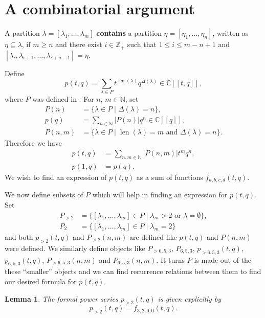 \documentclass[12pt, a4paper]{article}
\newtheorem{lemma}{Lemma}
\DeclareMathOperator{\len}{len}
\begin{document}
\section{A combinatorial argument}
\label{sec:comb-argum}

A partition $\lambda = [\lambda_1, \dots, \lambda_m]$ \textbf{contains} a partition $\eta = [\eta_1, \dots, \eta_n]$, written as $\eta \subseteq \lambda$, if $m \ge n$ and there exist $i \in \mathbb{Z}_+$ such that $1 \le i \le m - n + 1$ and $[\lambda_i, \lambda_{i + 1}, \dots, \lambda_{i + n - 1}] = \eta$.

Define
\begin{equation*}
  p(t, q) = \sum_{\lambda \in P}t^{\len(\lambda)}q^{\Delta(\lambda)} \in \mathbb{C}[[t, q]],
\end{equation*}
where $P$ was defined in .
For $n$, $m \in \mathbb{N}$, set
\begin{align*}
  P(n) &= \{\lambda \in P \mid \Delta(\lambda) = n\}, \\
  p(q) &= \sum_{n \in \mathbb{N}}|P(n)|q^n \in \mathbb{C}[[q]], \\
  P(n, m) &= \{\lambda \in P \mid \len(\lambda) = m\text{ and }\Delta(\lambda) = n\}.
\end{align*}
Therefore we have
\begin{align*}
  p(t, q) &= \sum_{n, m \in \mathbb{N}}|P(n, m)|t^mq^n, \\
  p(1, q) &= p(q).
\end{align*}
We wish to find an expression of $p(t, q)$ as a sum of functions $f_{a, b, c, d}(t, q)$.

We now define subsets of $P$ which will help in finding an expression for $p(t, q)$.
Set
\begin{align*}
  P_{>2} &= \{[\lambda_1, \dots, \lambda_m] \in P \mid \lambda_m > 2\text{ or }\lambda = \emptyset\}, \\
  P_2 &= \{[\lambda_1, \dots, \lambda_m] \in P \mid \lambda_m = 2\}
\end{align*}
and both $p_{>2}(t, q)$ and $P_{>2}(n, m)$ are defined like $p(t, q)$ and $P(n, m)$ were defined.
We similarly define objects like $P_{>6, 5, 3}$, $P_{6, 5, 3}$, $p_{>6, 5, 3}(t, q)$, $p_{6, 5, 3}(t, q)$, $P_{>6, 5, 3}(n, m)$ and $P_{6, 5, 3}(n, m)$.
It turns $P$ is made out of the these ``smaller'' objects and we can find recurrence relations between them to find our desired formula for $p(t, q)$.

\begin{lemma}
  \label{lmm:2}
  The formal power series $p_{>2}(t, q)$ is given explicitly by
  \begin{equation*}
    p_{>2}(t, q) = f_{3, 2, 0, 0}(t, q).
  \end{equation*}
\end{lemma}
\end{document}
